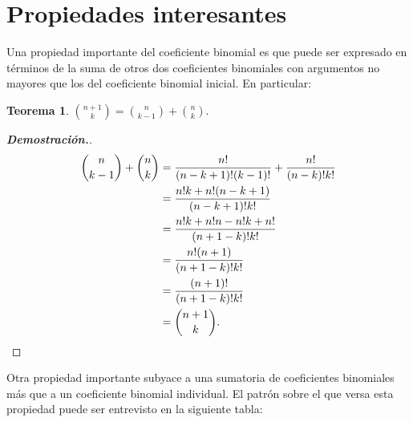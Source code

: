 \documentclass{article}
\theoremstyle{definition}
\newtheorem{teor}{Teorema}
\begin{document}
\section{Propiedades interesantes}
Una propiedad importante del coeficiente binomial es que puede ser expresado en términos de la suma de otros dos coeficientes binomiales con argumentos no mayores que los del coeficiente binomial inicial. En particular:
\begin{teor}
$\displaystyle\binom{n+1}{k}=\displaystyle\binom{n}{k-1}+\displaystyle\binom{n}{k}.$
\end{teor}
\begin{proof}[\textbf{{Demostración.}}]
\begin{align*}
    \displaystyle \binom{n}{k-1}+\displaystyle \binom{n}{k} &= \dfrac{n!}{(n-k+1)!(k-1)!}+\dfrac{n!}{(n-k)!k!}\\ &=\dfrac{n!k+n!(n-k+1)}{(n-k+1)!k!}\\ &=\dfrac{n!k+n!n-n!k+n!}{(n+1-k)!k!} \\ &= \dfrac{n!(n+1)}{(n+1-k)!k!} \\ &= \dfrac{(n+1)!}{(n+1-k)!k!}\\ &= \displaystyle \binom{n+1}{k}.
\end{align*}
\end{proof}

Otra propiedad importante subyace a una sumatoria de coeficientes binomiales más que a un coeficiente binomial individual. El patrón sobre el que versa esta propiedad puede ser entrevisto en la siguiente tabla:
\end{document}
